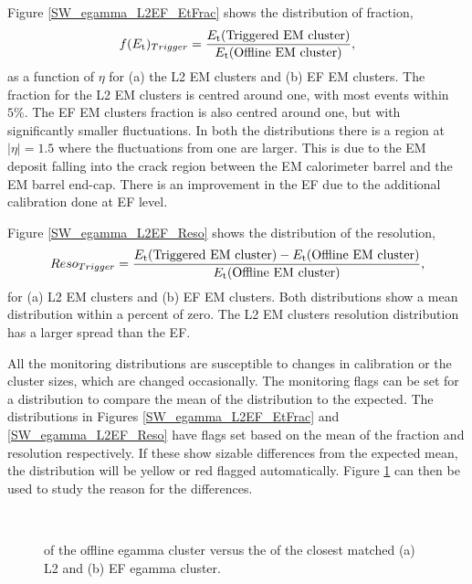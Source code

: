 Figure \ref{SW_egamma_L2EF_EtFrac} shows the distribution of \et{} fraction,
\begin{equation}
f(\mbox{$E_{\rm t}$}{})_{Trigger}=\frac{\mbox{$E_{\rm t}$}{}(\rm{Triggered~EM~cluster})}{\mbox{$E_{\rm t}$}{}(\rm{Offline~EM~cluster})},
\label{SW:EtFrac}
\end{equation}
as a function of $\eta{}$ for (a) the L2 EM clusters and (b) EF EM clusters.
The \et{} fraction for the L2 EM clusters is centred around one, with most events within $5\%$.
The EF EM clusters \et{} fraction is also centred around one, but with significantly smaller fluctuations.
In both the distributions there is a region at $|\eta{}|=1.5$ where the fluctuations from one are larger.
This is due to the EM deposit falling into the crack region between the EM calorimeter barrel and the EM barrel end-cap.
There is an improvement in the EF due to the additional calibration done at EF level. 

Figure \ref{SW_egamma_L2EF_Reso} shows the distribution of the \et{} resolution,
\begin{equation}
Reso_{Trigger}=\frac{\mbox{$E_{\rm t}$}{}(\rm{Triggered~EM~cluster})-\mbox{$E_{\rm t}$}{}(\rm{Offline~EM~cluster})}{\mbox{$E_{\rm t}$}{}(\rm{Offline~EM~cluster})},
\label{SW:EtReso}
\end{equation}
for (a) L2 EM clusters and (b) EF EM clusters.
Both distributions show a mean \et{} distribution within a percent of zero. 
The L2 EM clusters \et{} resolution distribution has a larger spread than the EF.


All the monitoring distributions are susceptible to changes in calibration or the cluster sizes, which are changed occasionally. 
The monitoring flags can be set for a distribution to compare the mean of the distribution to the expected.
The distributions in Figures \ref{SW_egamma_L2EF_EtFrac} and \ref{SW_egamma_L2EF_Reso} have flags set based on the mean of the \et{} fraction and \et{} resolution respectively. 
If these show sizable differences from the expected mean, the distribution will be yellow or red flagged automatically.
Figure \ref{SW_egamma_L2EF_EtEt} can then be used to study the reason for the differences.

 
\begin{figure}
\centering
\mbox{
   \quad
      \quad
}
\caption[Offline egamma \et{} versus L2 and EF egamma \et{}]{\et{} of the offline egamma cluster versus the \et{} of the closest matched (a) L2 and (b) EF egamma cluster.\label{SW_egamma_L2EF_EtEt}}
\end{figure}


